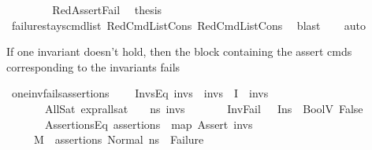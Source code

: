 \begin{isabellebody}
\ \ \isamarkupfalse%
\isanewline
\ \ \ \ \isamarkupfalse%
\ RedAssertFail\ \isamarkupfalse%
\ {\isacharquery}{\kern0pt}thesis\ \isamarkupfalse%
\ failure{\isacharunderscore}{\kern0pt}stays{\isacharunderscore}{\kern0pt}cmd{\isacharunderscore}{\kern0pt}list\ RedCmdListCons{\isacharparenleft}{\kern0pt}{}{\isacharparenright}{\kern0pt}\ RedCmdListCons{\isacharparenleft}{\kern0pt}{}{\isacharparenright}{\kern0pt}\ \isamarkupfalse%
\ blast\isanewline
\ \ \isamarkupfalse%
\ auto\isanewline
{}\isamarkupfalse%
%
\endisatagproof
{\isafoldproof}%
%
\isadelimproof
%
\endisadelimproof
%
\begin{isamarkuptext}%
If one invariant doesn't hold, then the block containing the assert cmds corresponding to the invariants fails%
\end{isamarkuptext}\isamarkuptrue%
\isamarkupfalse%
\ one{\isacharunderscore}{\kern0pt}inv{\isacharunderscore}{\kern0pt}fails{\isacharunderscore}{\kern0pt}assertions{\isacharcolon}{\kern0pt}\ \isanewline
\ \ \ InvsEq{\isacharcolon}{\kern0pt}\ {\isachardoublequoteopen}invs\ {\isacharequal}{\kern0pt}\ invs{}\ {\isacharat}{\kern0pt}\ {\isacharbrackleft}{\kern0pt}I{\isacharbrackright}{\kern0pt}\ {\isacharat}{\kern0pt}\ invs{}{\isachardoublequoteclose}\isanewline
\ \ \ \ \ \ \ AllSat{\isacharcolon}{\kern0pt}\ {\isachardoublequoteopen}expr{\isacharunderscore}{\kern0pt}all{\isacharunderscore}{\kern0pt}sat\ {\isasymLambda}\ {\isasymGamma}\ {\isasymOmega}\ ns{}\ invs{}{\isachardoublequoteclose}\isanewline
\ \ \ \ \ \ \ InvFail{\isacharcolon}{\kern0pt}\ {\isachardoublequoteopen}{\isasymLambda}{\isacharcomma}{\kern0pt}{\isasymGamma}{\isacharcomma}{\kern0pt}{\isasymOmega}\ {\isasymturnstile}\ {\isasymlangle}I{\isacharcomma}{\kern0pt}ns{}{\isasymrangle}\ {\isasymDown}\ BoolV\ False{\isachardoublequoteclose}\isanewline
\ \ \ \ \ \ \ AssertionsEq{\isacharcolon}{\kern0pt}\ {\isachardoublequoteopen}assertions\ {\isacharequal}{\kern0pt}\ map\ Assert\ invs{\isachardoublequoteclose}\isanewline
\ \ \ \ \ {\isachardoublequoteopen}M{\isacharcomma}{\kern0pt}{\isasymLambda}{\isacharcomma}{\kern0pt}{\isasymGamma}{\isacharcomma}{\kern0pt}{\isasymOmega}\ {\isasymturnstile}\ {\isasymlangle}assertions{\isacharcomma}{\kern0pt}\ Normal\ ns{}{\isasymrangle}\ {\isacharbrackleft}{\kern0pt}{\isasymrightarrow}{\isacharbrackright}{\kern0pt}\ Failure{\isachardoublequoteclose}\isanewline

\end{isabellebody}
